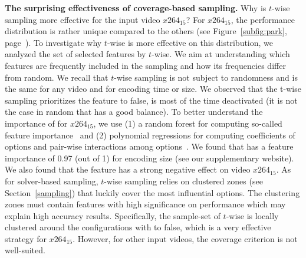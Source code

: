 \textbf{The surprising effectiveness of coverage-based sampling.}
Why is $t$-wise sampling more effective for the input video $x264_{15}$? 
For $x264_{15}$, the performance distribution is rather unique compared to the others (see Figure~\ref{subfig:park}, page~\pageref{subfig:park}). 
To investigate why $t$-wise is more effective on this distribution, we analyzed the set of selected features by $t$-wise. We aim at understanding which features are frequently included in the sampling and how its frequencies differ from random. 
We recall that $t$-wise sampling is not subject to randomness and is the same for any video and for encoding time or size.
We observed that the t-wise sampling prioritizes the feature  to false, \ie {} is most of the time deactivated (it is not the case in random that has a good balance). 
To better understand the importance of  for $x264_{15}$, we use (1) a random forest for computing so-called feature importance~\cite{breiman2001random, ftimportancerf,molnar2019,allmodelwrong2018} and (2) polynomial regressions for computing coefficients of options and pair-wise interactions among options~\cite{samreen2016, westermann2012, grebhahn2017}. 
We found that  has a feature importance of 0.97 (out of 1) for encoding size (see our supplementary website). We also found that the feature  has a strong negative effect on video $x264_{15}$.
 As for solver-based sampling, $t$-wise sampling relies on clustered zones (see Section~\ref{sampling}) that luckily cover the most influential options.
The clustering zones must contain features with high significance on performance which may explain high accuracy results.
Specifically, the sample-set of $t$-wise is locally clustered around the configurations with  to false, which is a very effective strategy for $x264_{15}$. However, for other input videos, the coverage criterion is not well-suited. 



